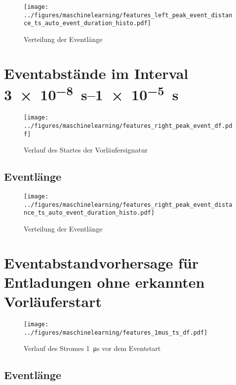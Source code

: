 \begin{figure}[htbp]
    \centering
      \texttt{[image: ../figures/maschinelearning/features\_left\_peak\_event\_distance\_ts\_auto\_event\_duration\_histo.pdf]}
      \caption{Verteilung der Eventlänge}
      \label{fig:event_left_event_duration_box}
\end{figure}






\section{Eventabstände im Interval \SIrange{3e-8}{1e-5}{\second}}

\begin{figure}[htbp]
    \centering
      \texttt{[image: ../figures/maschinelearning/features\_right\_peak\_event\_df.pdf]}
      \caption{Verlauf des Startes der Vorläufersignatur}
      \label{fig:event-right-current_sliece}
\end{figure}

\subsection{Eventlänge}

\begin{figure}[htbp]
    \centering
      \texttt{[image: ../figures/maschinelearning/features\_right\_peak\_event\_distance\_ts\_auto\_event\_duration\_histo.pdf]}
      \caption{Verteilung der Eventlänge}
      \label{fig:event_right_event_duration_box}
\end{figure}



\section{Eventabstandvorhersage für Entladungen ohne erkannten Vorläuferstart}

\begin{figure}[htbp]
    \centering
      \texttt{[image: ../figures/maschinelearning/features\_1mus\_ts\_df.pdf]}
      \caption{Verlauf des Stromes \SI{1}{\micro\second} vor dem Eventstart}
      \label{fig:1mus-current-sliece}
\end{figure}

\subsection{Eventlänge}

